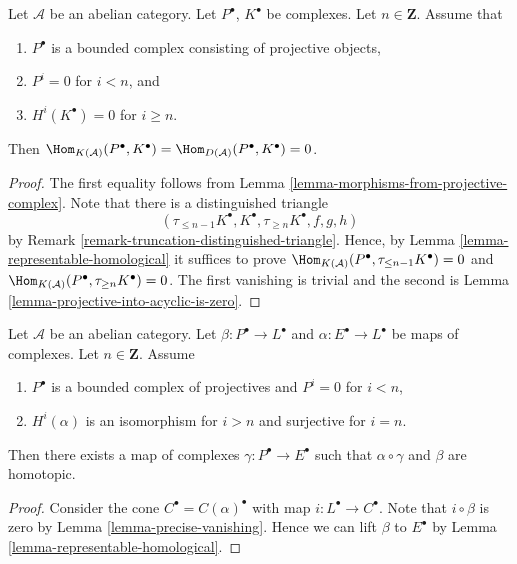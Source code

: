\begin{lemma}
\label{lemma-precise-vanishing}
Let $\mathcal{A}$ be an abelian category.
Let $P^\bullet$, $K^\bullet$ be complexes.
Let $n \in \mathbf{Z}$. Assume that
\begin{enumerate}
\item $P^\bullet$ is a bounded complex consisting of projective
objects,
\item $P^i = 0$ for $i < n$, and
\item $H^i(K^\bullet) = 0$ for $i \geq n$.
\end{enumerate}
Then
$\Hom_{K(\mathcal{A})}(P^\bullet, K^\bullet) =
\Hom_{D(\mathcal{A})}(P^\bullet, K^\bullet) = 0$.
\end{lemma}

\begin{proof}
The first equality follows from
Lemma \ref{lemma-morphisms-from-projective-complex}.
Note that there is a distinguished triangle
$$
(\tau_{\leq n - 1}K^\bullet, K^\bullet, \tau_{\geq n}K^\bullet, f, g, h)
$$
by Remark \ref{remark-truncation-distinguished-triangle}. Hence, by
Lemma \ref{lemma-representable-homological}
it suffices to prove
$\Hom_{K(\mathcal{A})}(P^\bullet, \tau_{\leq n - 1}K^\bullet) = 0$ and
$\Hom_{K(\mathcal{A})}(P^\bullet, \tau_{\geq n} K^\bullet) = 0$.
The first vanishing is trivial and the second is
Lemma \ref{lemma-projective-into-acyclic-is-zero}.
\end{proof}

\begin{lemma}
\label{lemma-lift-map}
Let $\mathcal{A}$ be an abelian category.
Let $\beta : P^\bullet \to L^\bullet$ and
$\alpha : E^\bullet \to L^\bullet$ be
maps of complexes. Let $n \in \mathbf{Z}$. Assume
\begin{enumerate}
\item $P^\bullet$ is a bounded complex of projectives and
$P^i = 0$ for $i < n$,
\item $H^i(\alpha)$ is an isomorphism for $i > n$ and surjective
for $i = n$.
\end{enumerate}
Then there exists a map of complexes $\gamma : P^\bullet \to E^\bullet$
such that $\alpha \circ \gamma$ and $\beta$ are homotopic.
\end{lemma}

\begin{proof}
Consider the cone $C^\bullet = C(\alpha)^\bullet$ with map
$i : L^\bullet \to C^\bullet$.
Note that $i \circ \beta$ is zero by
Lemma \ref{lemma-precise-vanishing}.
Hence we can lift $\beta$ to $E^\bullet$ by
Lemma \ref{lemma-representable-homological}.
\end{proof}












